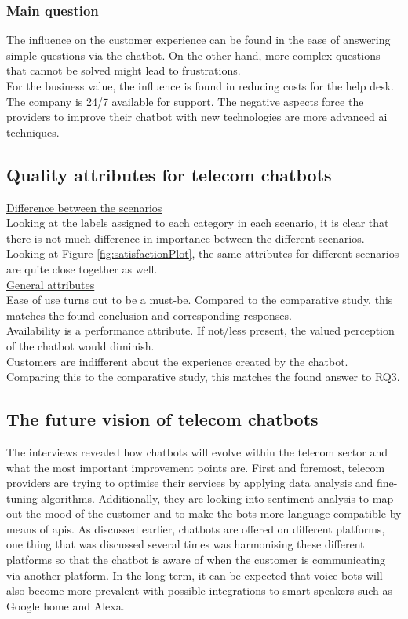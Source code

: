 \subsubsection{Main question}
The influence on the customer experience can be found in the ease of answering simple questions via the chatbot. On the other hand, more complex questions that cannot be solved might lead to frustrations.\\
For the business value, the influence is found in reducing costs for the help desk. The company is 24/7 available for support. The negative aspects force the providers to improve their chatbot with new technologies are more advanced \acrshort{ai} techniques.

\subsection{Quality attributes for telecom chatbots}
\ul{Difference between the scenarios}\\
Looking at the labels assigned to each category in each scenario, it is clear that there is not much difference in importance between the different scenarios. Looking at Figure \ref{fig:satisfactionPlot}, the same attributes for different scenarios are quite close together as well.\\
\break
\ul{General attributes}\\
Ease of use turns out to be a must-be. Compared to the comparative study, this matches the found conclusion and corresponding responses.\\
Availability is a performance attribute. If not/less present, the valued perception of the chatbot would diminish.\\
Customers are indifferent about the experience created by the chatbot. Comparing this to the comparative study, this matches the found answer to RQ3.

\subsection{The future vision of telecom chatbots}
The interviews revealed how chatbots will evolve within the telecom sector and what the most important improvement points are. First and foremost, telecom providers are trying to optimise their services by applying data analysis and fine-tuning algorithms. Additionally, they are looking into sentiment analysis to map out the mood of the customer and to make the bots more language-compatible by means of \acrshort{api}s. As discussed earlier, chatbots are offered on different platforms, one thing  that was discussed several times was harmonising these different platforms so that the chatbot is aware of when the customer is communicating via another platform. In the long term, it can be expected that voice bots will also become more prevalent with possible integrations to smart speakers such as Google home and Alexa.
\FloatBarrier